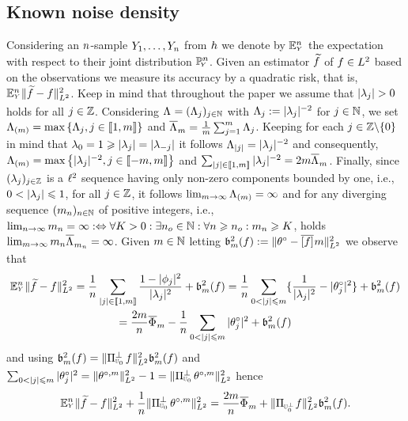 \subsection{Known noise density}
\begin{te}
Considering an \iid $\ssY$-sample $\rY_1,\dotsc,\rY_{\ssY}$ from $\ydf$
we denote by $\FuEx[\ssY]{\rY}$ the expectation with respect to their
joint distribution $\FuVg[\ssY]{\rY}$. Given an estimator $\txdf[]$ of $\xdf\in\Lp^2$
based on the observations %
we measure its accuracy
by a quadratic risk, that is, $\FuEx[\ssY]{\rY}\VnormLp{\txdf[]-\xdf}^2$.
Keep in mind that throughout the paper we assume that $|\fedf[j]|>0$ holds for all $j\in\Zz$. Considering $\iSv[]=\Nsuite{\iSv[j]}$ with $\iSv[j]:=|\fedf[j]|^{-2}$ for
$j\in\Nz$, we set  $\miSv=\max\set{\iSv[j],j\in\nset{1,\Di}}$ and
$\oiSv=\tfrac{1}{\Di}\sum_{j=1}^{\Di}\iSv[j]$. Keeping for each
$j\in\Zz\backslash\{0\}$ in mind that
$\fedf[0]=1\geq|\fedf[j]|=|\fedf[-j]|$ it follows $\iSv[|j|]=|\fedf[j]|^{-2}$ and consequently,
$\miSv=\max\set{|\fedf[j]|^{-2},j\in\nset{-\Di,\Di}}$ and
$\sum_{|j|\in\nset{1,\Di}}|\fedf[j]|^{-2}=2\Di\oiSv$. Finally, since
$\Zsuite[j]{\fedf[j]}$ is a $\lp^2$ sequence having only non-zero
components bounded by one, i.e., $0<|\fedf[j]|\leq1$, for all
$j\in\Zz$, it follows $\lim_{\Di\to\infty}\miSv=\infty$ and for any
diverging sequence $\Nsuite[\ssY]{\Di_{\ssY}}$ of positive integers,
i.e., $\lim_{\ssY\to\infty}\Di_{\ssY}=\infty:\Leftrightarrow\forall
K>0:\exists n_o\in\Nz:\forall n\geq n_o:\Di_n\geq K$, holds $\lim_{\Di\to\infty}\Di_{\ssY}\oiSv[\Di_{\ssY}]=\infty$. Given
$\Di\in\Nz$  letting $\Bi^2(\xdf):=\VnormLp{\fxdf- \ofxdf{\Di}}^2$ we observe
that
\begin{multline*}
\FuEx[\ssY]{\rY}\VnormLp{\txdf-\xdf}^2=\frac{1}{n}\sum_{|j|\in\nset{1,\Di}}\frac{1-|\fydf[j]|^2}{|\Ev[j]|^2}+\Bi^2(\xdf)=\frac{1}{n}\sum_{0<|j|\leq\Di}\{\frac{1}{|\Ev[j]|^2}-|\fxdf[j]|^2\}+\Bi^2(\xdf)\\
=\frac{2\Di}{n}\oEvs - \frac{1}{n} \sum_{0<|j|\leq\Di}|\fxdf[j]|^2
+\Bi^2(\xdf)
\end{multline*}
and using
$\Bi^2(\xdf)=\VnormLp{\ProjC[{\mHiH[0]}]\xdf}^2\bias^2(\xdf)$ and $\sum_{0<|j|\leq\Di}|\fxdf[j]|^2=\VnormLp{\xdfPr}^2-1=\VnormLp{\ProjC[{\mHiH[0]}]\xdfPr}^2$
hence
\begin{equation}\label{oo:e1}
\FuEx[\ssY]{\rY}\VnormLp{\txdf-\xdf}^2+ \frac{1}{n} \VnormLp{\ProjC[{\mHiH[0]}]\xdfPr}^2=\frac{2\Di}{n}\oEvs +\VnormLp{\Proj[{\mHiH[0]^\perp}]\xdf}^2\bias^2(\xdf).

\end{equation}
\end{te}
